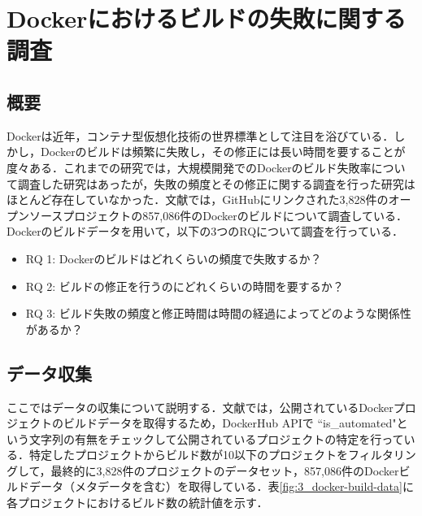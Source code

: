 \section{Dockerにおけるビルドの失敗に関する調査\cite{docker-failures}}
\subsection{概要}
Dockerは近年，コンテナ型仮想化技術の世界標準として注目を浴びている．しかし，Dockerのビルドは頻繁に失敗し，その修正には長い時間を要することが度々ある．これまでの研究では，大規模開発でのDockerのビルド失敗率について調査した研究はあったが，失敗の頻度とその修正に関する調査を行った研究はほとんど存在していなかった．文献\cite{docker-failures}では，GitHubにリンクされた3,828件のオープンソースプロジェクトの857,086件のDockerのビルドについて調査している．Dockerのビルドデータを用いて，以下の3つのRQについて調査を行っている．

\begin{itemize}
  \item RQ 1: Dockerのビルドはどれくらいの頻度で失敗するか？
  \item RQ 2: ビルドの修正を行うのにどれくらいの時間を要するか？
  \item RQ 3: ビルド失敗の頻度と修正時間は時間の経過によってどのような関係性があるか？
\end{itemize}


\subsection{データ収集}
ここではデータの収集について説明する．文献\cite{docker-failures}では，公開されているDockerプロジェクトのビルドデータを取得するため，DockerHub APIで ``is\_automated"という文字列の有無をチェックして公開されているプロジェクトの特定を行っている．特定したプロジェクトからビルド数が10以下のプロジェクトをフィルタリングして，最終的に3,828件のプロジェクトのデータセット，857,086件のDockerビルドデータ（メタデータを含む）を取得している．表\ref{fig:3_docker-build-data}に各プロジェクトにおけるビルド数の統計値を示す．


